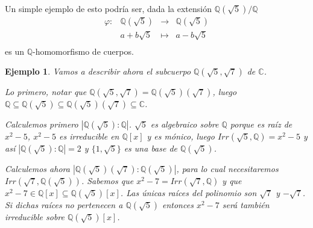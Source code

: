 \documentclass[12pt]{article}
\newtheorem{example}{Ejemplo}[theorem]
\begin{document}
Un simple ejemplo de esto podría ser, dada la extensión $\mathbb{Q}(\sqrt{5})/\mathbb{Q}$ $$\begin{array}{rccl}
\varphi \colon &\mathbb{Q}(\sqrt{5})&\longrightarrow &\mathbb{Q}(\sqrt{5}) \\
&a+b\sqrt{5}& \longmapsto &a-b\sqrt{5}\\
\end{array}
$$ es un $\mathbb{Q}$-homomorfismo de cuerpos.

\begin{example} Vamos a describir ahora el subcuerpo $\mathbb{Q}(\sqrt{5}, \sqrt{7})$ de $\mathbb{C}$.

Lo primero, notar que $\mathbb{Q}(\sqrt{5}, \sqrt{7}) = \mathbb{Q}(\sqrt{5})(\sqrt{7})$, luego $\mathbb{Q} \subseteq \mathbb{Q}(\sqrt{5}) \subseteq \mathbb{Q}(\sqrt{5})(\sqrt{7}) \subseteq \mathbb{C}$. 

Calculemos primero $|\mathbb{Q}(\sqrt{5}) : \mathbb{Q}|$. $\sqrt{5}$ es algebraico sobre $\mathbb{Q}$ porque es raíz de $x^{2}-5$, $x^{2}-5$ es irreducible en $\mathbb{Q}[x]$ y es mónico, luego $Irr(\sqrt{5}, \mathbb{Q}) = x^{2}-5$ y así $|\mathbb{Q}(\sqrt{5}):\mathbb{Q}| = 2$ y $\lbrace 1, \sqrt{5} \rbrace$ es una base de $\mathbb{Q}(\sqrt{5})$.

Calculemos ahora $|\mathbb{Q}(\sqrt{5})(\sqrt{7}):\mathbb{Q}(\sqrt{5})|$, para lo cual necesitaremos $Irr(\sqrt{7}, \mathbb{Q}(\sqrt{5}))$. Sabemos que $x^{2}-7 = Irr(\sqrt{7}, \mathbb{Q})$ y que $x^{2}-7 \in \mathbb{Q}[x] \subseteq \mathbb{Q}(\sqrt{5})[x]$. Las únicas raíces del polinomio son $\sqrt{7}$ y $- \sqrt{7}$. Si dichas raíces no pertenecen  a $\mathbb{Q}(\sqrt{5})$ entonces $x^{2}-7$ será también irreducible sobre $\mathbb{Q}(\sqrt{5})[x]$.


\end{example}
\end{document}
